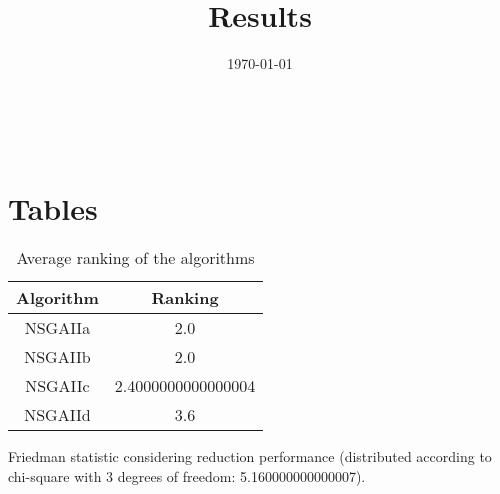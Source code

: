 \documentclass{article}
\title{Results}
\author{}
\date{\today}
\begin{document}
\oddsidemargin 0in \topmargin 0in\maketitle
\
\section{Tables}
\begin{table}[!htp]
\centering
\caption{Average ranking of the algorithms}
\begin{tabular}{c|c}
Algorithm&Ranking\\
\hline
NSGAIIa&2.0\\
NSGAIIb&2.0\\
NSGAIIc&2.4000000000000004\\
NSGAIId&3.6\\
\end{tabular}
\end{table}


Friedman statistic considering reduction performance (distributed according to chi-square with 3 degrees of freedom: 5.160000000000007).
\end{document}
